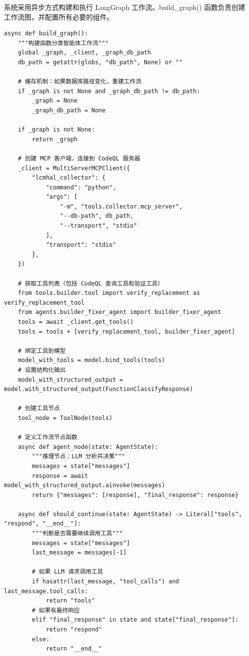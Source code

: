 系统采用异步方式构建和执行 LangGraph 工作流。build\_graph() 函数负责创建工作流图，并配置所有必要的组件。

\begin{lstlisting}[style=Python,abovecaptionskip=0pt,belowcaptionskip=0pt]
async def build_graph():
    """构建函数分类智能体工作流"""
    global _graph, _client, _graph_db_path
    db_path = getattr(globs, "db_path", None) or ""
    
    # 缓存机制：如果数据库路径变化，重建工作流
    if _graph is not None and _graph_db_path != db_path:
        _graph = None
        _graph_db_path = None
    
    if _graph is not None:
        return _graph

    # 创建 MCP 客户端，连接到 CodeQL 服务器
    _client = MultiServerMCPClient({
        "lcmhal_collector": {
            "command": "python",
            "args": [
                "-m", "tools.collector.mcp_server",
                "--db-path", db_path,
                "--transport", "stdio"
            ],
            "transport": "stdio"
        },
    })
    
    # 获取工具列表（包括 CodeQL 查询工具和验证工具）
    from tools.builder.tool import verify_replacement as verify_replacement_tool
    from agents.builder_fixer_agent import builder_fixer_agent
    tools = await _client.get_tools()
    tools = tools + [verify_replacement_tool, builder_fixer_agent]
    
    # 绑定工具到模型
    model_with_tools = model.bind_tools(tools)
    # 设置结构化输出
    model_with_structured_output = model.with_structured_output(FunctionClassifyResponse)
    
    # 创建工具节点
    tool_node = ToolNode(tools)
    
    # 定义工作流节点函数
    async def agent_node(state: AgentState):
        """推理节点：LLM 分析并决策"""
        messages = state["messages"]
        response = await model_with_structured_output.ainvoke(messages)
        return {"messages": [response], "final_response": response}
    
    async def should_continue(state: AgentState) -> Literal["tools", "respond", "__end__"]:
        """判断是否需要继续调用工具"""
        messages = state["messages"]
        last_message = messages[-1]
        
        # 如果 LLM 请求调用工具
        if hasattr(last_message, "tool_calls") and last_message.tool_calls:
            return "tools"
        # 如果有最终响应
        elif "final_response" in state and state["final_response"]:
            return "respond"
        else:
            return "__end__"
    

\end{lstlisting}
